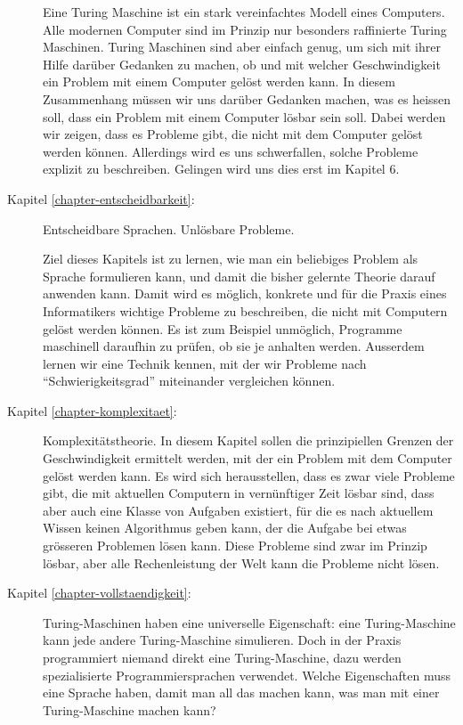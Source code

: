 \begin{description}
Eine Turing Maschine ist ein stark vereinfachtes Modell eines Computers.
Alle modernen Computer sind im Prinzip nur besonders raffinierte Turing Maschinen.
Turing Maschinen sind aber einfach genug, um sich mit ihrer Hilfe darüber Gedanken
zu machen, ob und mit welcher Geschwindigkeit ein Problem mit einem
Computer gelöst werden kann. In diesem Zusammenhang müssen wir uns
darüber Gedanken machen, was es heissen soll, dass ein Problem mit
einem Computer lösbar sein soll. Dabei werden wir zeigen, dass es Probleme
gibt, die nicht mit dem Computer gelöst werden können. Allerdings wird
es uns schwerfallen, solche Probleme explizit zu beschreiben. 
Gelingen wird uns dies erst im Kapitel 6.

\item[Kapitel \ref{chapter-entscheidbarkeit}:] Entscheidbare Sprachen. Unlösbare Probleme.

Ziel dieses Kapitels ist zu lernen, wie man ein beliebiges Problem als
Sprache formulieren kann, und damit die bisher gelernte Theorie darauf
anwenden kann. Damit wird es möglich, konkrete und für die Praxis eines
Informatikers wichtige Probleme zu beschreiben, die
nicht mit Computern gelöst werden können.
Es ist zum Beispiel unmöglich, Programme maschinell daraufhin
zu prüfen, ob sie je anhalten werden.
Ausserdem lernen wir eine Technik kennen, mit der wir Probleme 
nach ``Schwierigkeitsgrad'' miteinander vergleichen können. 

\item[Kapitel \ref{chapter-komplexitaet}:] Komplexitätstheorie. In diesem Kapitel sollen 
die prinzipiellen Grenzen der Geschwindigkeit ermittelt werden,
mit der ein Problem mit dem Computer gelöst werden kann. Es wird sich
herausstellen, dass es zwar viele Probleme gibt, die mit aktuellen Computern in
vernünftiger Zeit lösbar sind, dass aber auch eine Klasse von Aufgaben
existiert, für die es nach aktuellem Wissen keinen Algorithmus geben kann,
der die Aufgabe bei etwas grösseren Problemen lösen kann. Diese Probleme sind
zwar im Prinzip lösbar, aber alle Rechenleistung der Welt kann die Probleme nicht lösen.

\item[Kapitel \ref{chapter-vollstaendigkeit}:]
Turing-Maschinen haben eine universelle Eigenschaft: eine Turing-Maschine
kann jede andere Turing-Maschine simulieren. Doch in der Praxis
programmiert niemand direkt eine Turing-Maschine, dazu werden
spezialisierte Programmiersprachen verwendet.
Welche Eigenschaften muss eine Sprache haben, damit
man all das machen kann, was man mit einer Turing-Maschine
machen kann?
\end{description}


